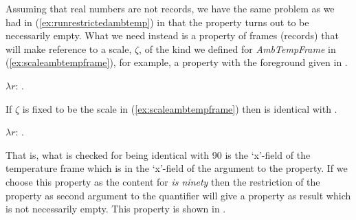 Assuming that real numbers are not records, we have the same problem
as we had in (\ref{ex:runrestrictedambtemp}) in that the property
turns out to be necessarily empty.  What we need instead is a property of frames (records) that will make
reference to a scale, $\zeta$, of the kind we defined for \textit{AmbTempFrame}
in (\ref{ex:scaleambtempframe}), for example, a property with the
foreground given in \nexteg{}.
\begin{ex} 
$\lambda r$: . 
\label{ex:isninety} 
\end{ex} 
If $\zeta$ is fixed to be the scale in (\ref{ex:scaleambtempframe})
then \preveg{} is identical with \nexteg{}.
\begin{ex} 
$\lambda r$: . 
\end{ex}          
That is, what is checked for being identical with 90 is the `x'-field of the temperature frame which is in the
`x'-field of the argument to the property.  If we choose this property
as the content for \textit{is ninety} then the restriction of the
property as second argument to the quantifier will give a property as
result which is not necessarily empty.  This property is shown in \nexteg{}.
